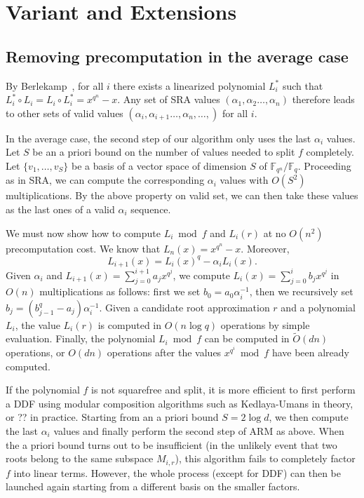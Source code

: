 \documentclass{sig-alternate}
\newcommand{\ff}[1]{\mathbb{F}_{#1}}
\newcommand{\fq}{\ff{q}}
\newcommand{\fqn}{\ff{q^n}}
\newcounter{algo}
\begin{document}


\section{Variant and Extensions}





\subsection{Removing precomputation in the average case}

By Berlekamp~\cite[Theorem..]{}, for all $i$ there exists a linearized polynomial $L_i^*$ such that $L_i^*\circ L_i=L_i\circ L_i^*=x^{q^n}-x$. Any set of SRA values $(\alpha_{1},\alpha_2\ldots,\alpha_{n})$ therefore leads to other sets of valid values $(\alpha_{i},\alpha_{i+1}\ldots,\alpha_{n},\ldots,)$ for all $i$.

In the average case, the second step of our algorithm only uses the last $\alpha_i$ values. Let $S$ be an a priori bound on the number of values needed to split $f$ completely. Let $\{v_1,\ldots,v_S\}$ be a basis of a vector space of dimension $S$ of $\fqn/\fq$. Proceeding as in SRA, we can compute the corresponding $\alpha_i$ values with $O(S^2)$ multiplications. By the above property on valid set, we can then take these values as the last ones of a valid $\alpha_i$ sequence.

We must now show how to compute $L_i\bmod f$ and $L_i(r)$ at no $O(n^2)$ precomputation cost. We know that $L_n(x)=x^{q^n}-x$. Moreover,
$$L_{i+1}(x)=L_i(x)^q-\alpha_iL_i(x).$$
Given $\alpha_i$ and $L_{i+1}(x)=\sum_{j=0}^{i+1}a_jx^{q^j}$, we compute $L_i(x)=\sum_{j=0}^{i}b_jx^{q^j}$ in $O(n)$ multiplications as follows: first we set $b_0=a_0\alpha_i^{-1}$, then we recursively set $b_j=(b_{j-1}^q-a_j)\alpha_i^{-1}$.
%
Given a candidate root approximation $r$ and a polynomial $L_i$, the value $L_i(r)$ is computed in $O(n\log q)$ operations by simple evaluation. 
%
Finally, the polynomial $L_i\bmod f$ can be computed in $\tilde O(dn)$ operations, or $O(dn)$ operations after the values $x^{q^i}\bmod f$ have been already computed.

If the polynomial $f$ is not squarefree and split, it is more efficient to first perform a DDF using modular composition algorithms such as Kedlaya-Umans in theory, or ?? in practice. Starting from an a priori bound $S=2\log d$, we then compute the last $\alpha_i$ values and finally perform the second step of ARM as above.
%
When the a priori bound turns out to be insufficient (in the unlikely event that two roots belong to the same subspace $M_{i,r}$), this algorithm fails to completely factor $f$ into linear terms. However, the whole process (except for DDF) can then be launched again starting from a different basis on the smaller factors.
\end{document}
